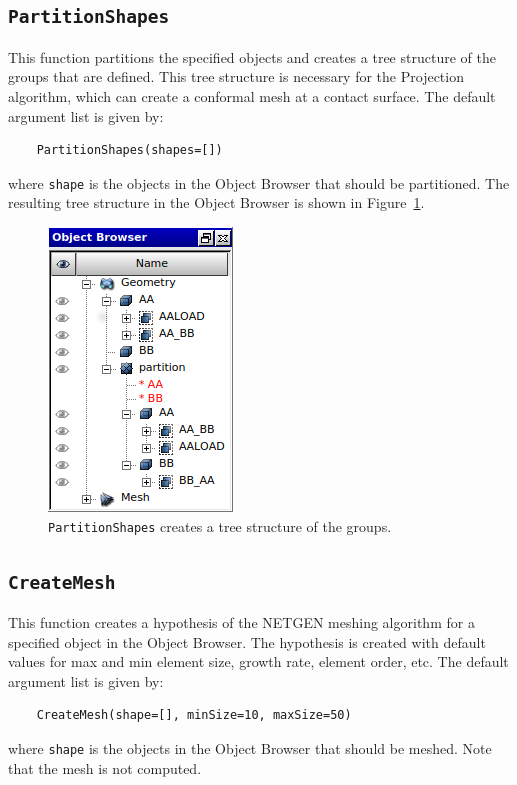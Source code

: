 \documentclass[10pt,a4paper,notitlepage]{scrartcl}
\begin{document}
\subsection*{\texttt{PartitionShapes}} %
\label{sub:partition_shapes}
This function partitions the specified objects and creates a tree structure of the groups that are defined. This tree structure is necessary for the Projection algorithm, which can create a conformal mesh at a contact surface. The default argument list is given by:
\begin{lstlisting}
	PartitionShapes(shapes=[])
\end{lstlisting}
where \texttt{shape} is the objects in the Object Browser that should be partitioned. The resulting tree structure in the Object Browser is shown in Figure~\ref{fig:treestructure}.
\begin{figure}[H]
	\centering
	\includegraphics{treestructure}
	\caption{\texttt{PartitionShapes} creates a tree structure of the groups.}
	\label{fig:treestructure}
\end{figure}

\subsection*{\texttt{CreateMesh}} %
\label{sub:create_mesh}
This function creates a hypothesis of the NETGEN meshing algorithm for a specified object in the Object Browser. The hypothesis is created with default values for max and min element size, growth rate, element order, etc. The default argument list is given by:
\begin{lstlisting}
	CreateMesh(shape=[], minSize=10, maxSize=50)
\end{lstlisting}
where \texttt{shape} is the objects in the Object Browser that should be meshed. Note that the mesh is not computed.
\end{document}
